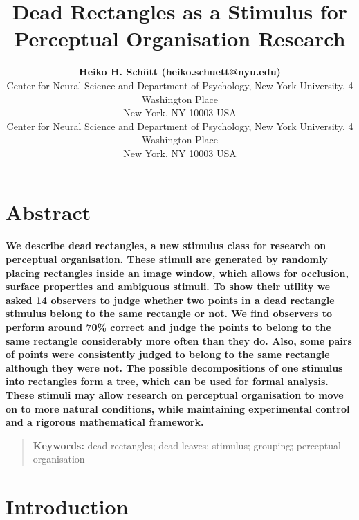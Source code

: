\documentclass[10pt,letterpaper]{article}
\title{Dead Rectangles as a Stimulus for Perceptual Organisation Research}
\author{{\large \bf Heiko H. Schütt (heiko.schuett@nyu.edu)} \\
  Center for Neural Science and Department of Psychology, New York University, 4 Washington Place\\
New York, NY 10003 USA
  \AND {\large \bf Wei Ji Ma (weijima@nyu.edu)} \\
    Center for Neural Science and Department of Psychology, New York University, 4 Washington Place\\
New York, NY 10003 USA}
\begin{document}
\maketitle

\section{Abstract}
{
\bf We describe dead rectangles, a new stimulus class for research on perceptual organisation. These stimuli are generated by randomly placing rectangles inside an image window, which allows for occlusion, surface properties and ambiguous stimuli. To show their utility we asked 14 observers to judge whether two points in a dead rectangle stimulus belong to the same rectangle or not. We find observers to perform around 70\% correct and judge the points to belong to the same rectangle considerably more often than they do. Also, some pairs of points were consistently judged to belong to the same rectangle although they were not. The possible decompositions of one stimulus into rectangles form a tree, which can be used for formal analysis. These stimuli may allow research on perceptual organisation to move on to more natural conditions, while maintaining experimental control and a rigorous mathematical framework.
}
\begin{quote}
\small
\textbf{Keywords:} 
dead rectangles; dead-leaves; stimulus; grouping; perceptual organisation
\end{quote}

\section{Introduction}
\end{document}
